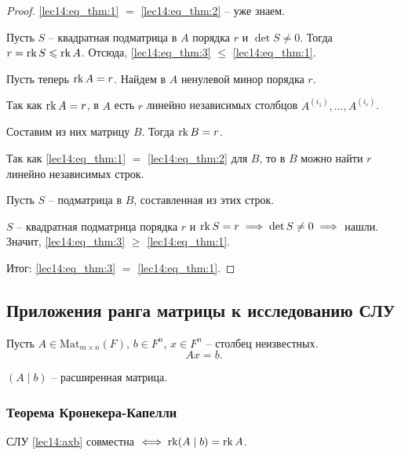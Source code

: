 \begin{proof}
    \ref{lec14:eq_thm:1} $=$ \ref{lec14:eq_thm:2} -- уже знаем.

    Пусть $S$ -- квадратная подматрица в $A$ порядка $r$ и $\det S \neq 0$.
    Тогда $r = \operatorname{\mathop{\mathrm{rk}}} S \leqslant \operatorname{\mathop{\mathrm{rk}}} A$.
    Отсюда, \ref{lec14:eq_thm:3} $\leq$ \ref{lec14:eq_thm:1}.

    \bigskip
    Пусть теперь $\operatorname{\mathop{\mathrm{rk}}} A = r$. Найдем в $A$ ненулевой минор порядка $r$.

    Так как $\operatorname{\mathop{\mathrm{rk}}} A = r$, в $A$ есть $r$ линейно независимых столбцов $A^{(i_1)}, \dots, A^{(i_r)}$. 

    Составим из них матрицу $B$. Тогда $\operatorname{\mathop{\mathrm{rk}}} B = r$.

    Так как \ref{lec14:eq_thm:1} $=$ \ref{lec14:eq_thm:2} для $B$, то в $B$ можно найти $r$ линейно независимых строк.

    Пусть $S$ -- подматрица в $B$, составленная из этих строк. 

    $S$ -- квадратная подматрица порядка $r$ и $\operatorname{\mathop{\mathrm{rk}}} S = r \implies \det S \neq 0 \implies $ нашли. Значит, \ref{lec14:eq_thm:3} $\geq$ \ref{lec14:eq_thm:1}.

    \bigskip
    Итог: \ref{lec14:eq_thm:3} $=$ \ref{lec14:eq_thm:1}.
\end{proof}


\subsection{Приложения ранга матрицы к исследованию СЛУ}

Пусть $A \in \text{Mat}_{m \times n}(F)$, $b \in F^n$, $x \in F^n$ -- столбец неизвестных.
\begin{equation*}
    \tag{$\star$}
    \label{lec14:axb}
    Ax = b
.\end{equation*}

$(A \mid b)$ -- расширенная матрица.

\subsubsection{Теорема Кронекера-Капелли}

\begin{theorem}
    СЛУ \eqref{lec14:axb} совместна $\iff \operatorname{\mathop{\mathrm{rk}}} (A \mid b) = \operatorname{\mathop{\mathrm{rk}}} A$.
\end{theorem}

